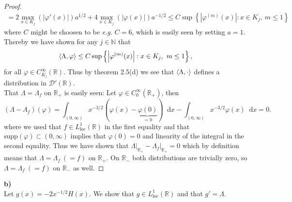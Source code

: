 \documentclass[a4paper,11pt]{article}
\newcommand{\supp}{\text{supp}}
\newcommand{\abs}[1]{\left\lvert #1 \right\rvert}
\newcommand*\diff{\mathop{}\!\mathrm{d}}
\newcommand{\eg}{\emph{e.g.} }
\newcommand{\R}{\mathbb{R}}
\newcommand{\N}{\mathbb{N}}
\newcommand{\loc}{\text{loc}}
\numberwithin{equation}{section}
\begin{document}
\begin{proof}
\begin{equation}
\begin{aligned}
	=2\max_{x\in K_j }(\abs{\varphi'(x)}) a^{1/2}+4\max_{x\in K_j}(\abs{\varphi(x)})a^{-1/2}\leq C \sup\left\{\abs{\varphi^{(m)}(x)} : x\in K_j,\ m\leq 1\right\}
	\end{aligned}
	\end{equation}
	where $ C $ might be choosen to be \eg $ C=6 $, which is easily seen by setting $ a=1 $. 
	Thereby we have shown for any $ j\in \N $ that \begin{equation}
	\braket{\Lambda,\varphi}\leq C \sup\left\{\abs{\varphi^{(m)}(x)} : x\in K_j,\ m\leq 1\right\},
	\end{equation} for all $ \varphi\in C^\infty_{K_j}(\R) $. Thus by theorem 2.5(d) we see that $ \braket{\Lambda,\cdot} $ defines a distribution in $ \mathcal{D}'(\R) $.\\
	That $ \Lambda=\Lambda_f $ on $ \R_+ $ is easily seen: Let $ \varphi\in C^\infty_0(\R_+) $, then \begin{equation}
	(\Lambda-\Lambda_f)(\varphi)=\int_{(0,\infty)} x^{-3/2} \left(\varphi(x)-\underbrace{\varphi(0)}_{=0}\right)\diff x-\int_{(0,\infty)} x^{-3/2}\varphi(x)\diff x=0.
	\end{equation}
	where we used that $ f\in L^1_\loc(\R) $ in the first equality and that $ \supp(\varphi)\subset(0,\infty) $ implies that $ \varphi(0)=0 $ and linearity of the integral in the second equality. Thus we have shown that $ \Lambda\lvert_{\R_+}-\Lambda_f\lvert_{\R_+}=0 $ which by definition means that $ \Lambda=\Lambda_f\ (=f) $ on $ \R_+ $. On $ \R_- $ both distributions are trivially zero, so $ \Lambda=\Lambda_f\ (=f) $ on $ \R_- $ as well. 
\end{proof}
\vspace{0.2cm}
\noindent\textbf{b)}\\
Let $ g(x)=-2x^{-1/2}H(x) $. We show that $ g\in L^1_\loc(\R) $ and that $ g'=\Lambda $.
\end{document}
